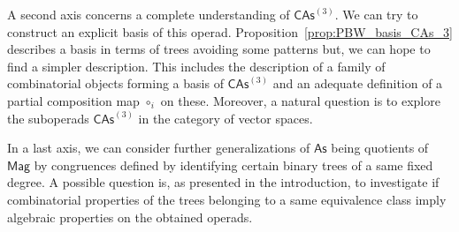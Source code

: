 \documentclass[10pt,reqno]{amsart}
\numberwithin{equation}{subsection}
\newcommand{\Mag}{\mathsf{Mag}}
\newcommand{\As}{\mathsf{As}}
\newcommand{\CAs}[1]{\mathsf{CAs}^{(#1)}}
\begin{document}
A second axis concerns a complete understanding of $\CAs{3}$. We can
try to construct an explicit basis of this operad.
Proposition~\ref{prop:PBW_basis_CAs_3} describes a basis in terms of
trees avoiding some patterns but, we can hope to find a simpler
description. This includes the description of a family of combinatorial
objects forming a basis of $\CAs{3}$ and an adequate definition of a
partial composition map $\circ_i$ on these. Moreover, a natural
question is to explore the suboperads $\CAs{3}$ in the category of
vector spaces.
\medbreak

In a last axis, we can consider further generalizations of $\As$ being
quotients of $\Mag$ by congruences defined by identifying certain binary
trees of a same fixed degree. A possible question is, as presented in
the introduction, to investigate if combinatorial properties of the
trees belonging to a same equivalence class imply algebraic properties
on the obtained operads.
\medbreak



\end{document}
